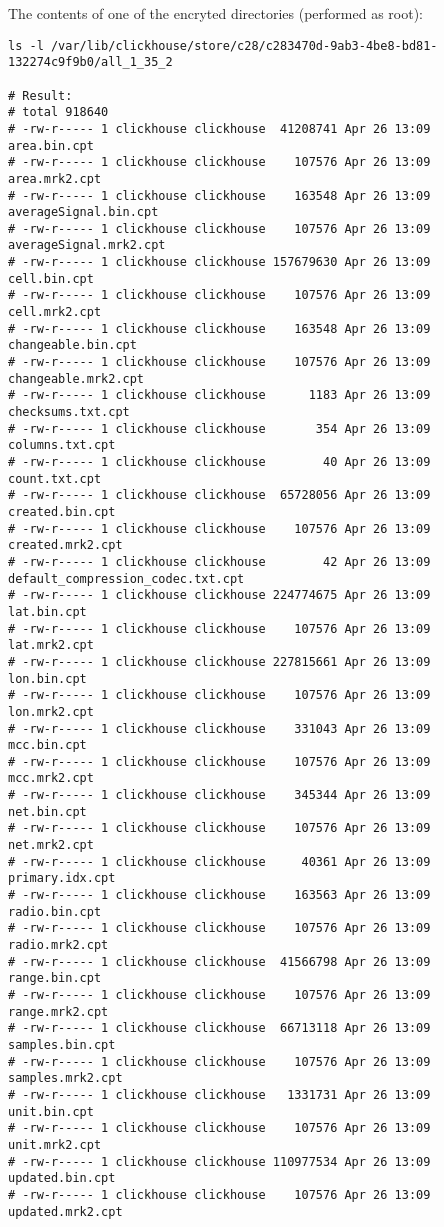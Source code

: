 The contents of one of the encryted directories (performed as root):
\begin{verbatim}
ls -l /var/lib/clickhouse/store/c28/c283470d-9ab3-4be8-bd81-132274c9f9b0/all_1_35_2

# Result:
# total 918640
# -rw-r----- 1 clickhouse clickhouse  41208741 Apr 26 13:09 area.bin.cpt
# -rw-r----- 1 clickhouse clickhouse    107576 Apr 26 13:09 area.mrk2.cpt
# -rw-r----- 1 clickhouse clickhouse    163548 Apr 26 13:09 averageSignal.bin.cpt
# -rw-r----- 1 clickhouse clickhouse    107576 Apr 26 13:09 averageSignal.mrk2.cpt
# -rw-r----- 1 clickhouse clickhouse 157679630 Apr 26 13:09 cell.bin.cpt
# -rw-r----- 1 clickhouse clickhouse    107576 Apr 26 13:09 cell.mrk2.cpt
# -rw-r----- 1 clickhouse clickhouse    163548 Apr 26 13:09 changeable.bin.cpt
# -rw-r----- 1 clickhouse clickhouse    107576 Apr 26 13:09 changeable.mrk2.cpt
# -rw-r----- 1 clickhouse clickhouse      1183 Apr 26 13:09 checksums.txt.cpt
# -rw-r----- 1 clickhouse clickhouse       354 Apr 26 13:09 columns.txt.cpt
# -rw-r----- 1 clickhouse clickhouse        40 Apr 26 13:09 count.txt.cpt
# -rw-r----- 1 clickhouse clickhouse  65728056 Apr 26 13:09 created.bin.cpt
# -rw-r----- 1 clickhouse clickhouse    107576 Apr 26 13:09 created.mrk2.cpt
# -rw-r----- 1 clickhouse clickhouse        42 Apr 26 13:09 default_compression_codec.txt.cpt
# -rw-r----- 1 clickhouse clickhouse 224774675 Apr 26 13:09 lat.bin.cpt
# -rw-r----- 1 clickhouse clickhouse    107576 Apr 26 13:09 lat.mrk2.cpt
# -rw-r----- 1 clickhouse clickhouse 227815661 Apr 26 13:09 lon.bin.cpt
# -rw-r----- 1 clickhouse clickhouse    107576 Apr 26 13:09 lon.mrk2.cpt
# -rw-r----- 1 clickhouse clickhouse    331043 Apr 26 13:09 mcc.bin.cpt
# -rw-r----- 1 clickhouse clickhouse    107576 Apr 26 13:09 mcc.mrk2.cpt
# -rw-r----- 1 clickhouse clickhouse    345344 Apr 26 13:09 net.bin.cpt
# -rw-r----- 1 clickhouse clickhouse    107576 Apr 26 13:09 net.mrk2.cpt
# -rw-r----- 1 clickhouse clickhouse     40361 Apr 26 13:09 primary.idx.cpt
# -rw-r----- 1 clickhouse clickhouse    163563 Apr 26 13:09 radio.bin.cpt
# -rw-r----- 1 clickhouse clickhouse    107576 Apr 26 13:09 radio.mrk2.cpt
# -rw-r----- 1 clickhouse clickhouse  41566798 Apr 26 13:09 range.bin.cpt
# -rw-r----- 1 clickhouse clickhouse    107576 Apr 26 13:09 range.mrk2.cpt
# -rw-r----- 1 clickhouse clickhouse  66713118 Apr 26 13:09 samples.bin.cpt
# -rw-r----- 1 clickhouse clickhouse    107576 Apr 26 13:09 samples.mrk2.cpt
# -rw-r----- 1 clickhouse clickhouse   1331731 Apr 26 13:09 unit.bin.cpt
# -rw-r----- 1 clickhouse clickhouse    107576 Apr 26 13:09 unit.mrk2.cpt
# -rw-r----- 1 clickhouse clickhouse 110977534 Apr 26 13:09 updated.bin.cpt
# -rw-r----- 1 clickhouse clickhouse    107576 Apr 26 13:09 updated.mrk2.cpt
\end{verbatim}

